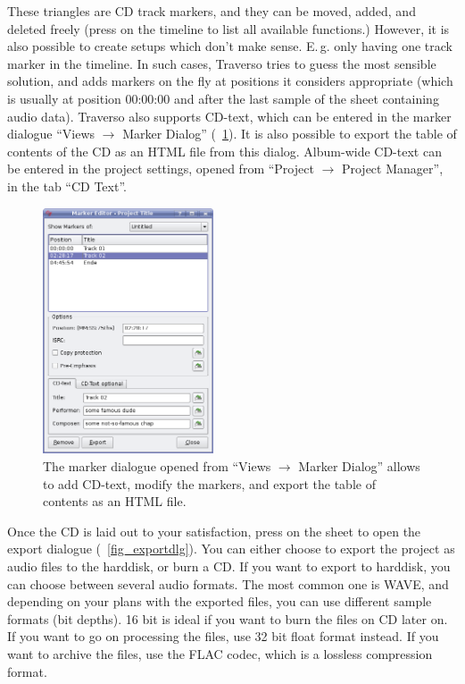 These triangles are CD track markers, and they can be moved, added, and deleted freely (press  on the timeline to list all available functions.) However, it is also possible to create setups which don't make sense. E.\,g. only having one track marker in the timeline. In such cases, Traverso tries to guess the most sensible solution, and adds markers on the fly at positions it considers appropriate (which is usually at position 00:00:00 and after the last sample of the sheet containing audio data). Traverso also supports CD-text, which can be entered in the marker dialogue ``Views $\rightarrow$ Marker Dialog'' (\FigB~\ref{fig_marker-editor}). It is also possible to export the table of contents of the CD as an HTML file from this dialog. Album-wide CD-text can be entered in the project settings, opened from ``Project $\rightarrow$ Project Manager'', in the tab ``CD Text''.

\begin{figure}[ht]
 \centering\includegraphics[width=0.45\textwidth]{images/marker-editor}
 \caption{The marker dialogue opened from ``Views $\rightarrow$ Marker Dialog'' allows to add CD-text, modify the markers, and export the table of contents as an HTML file.}
 \label{fig_marker-editor}
\end{figure}

Once the CD is laid out to your satisfaction, press  on the sheet to open the export dialogue (\FigB~\ref{fig_exportdlg}). You can either choose to export the project as audio files to the harddisk, or burn a CD. If you want to export to harddisk, you can choose between several audio formats. The most common one is WAVE, and depending on your plans with the exported files, you can use different sample formats (bit depths). 16 bit is ideal if you want to burn the files on CD later on. If you want to go on processing the files, use 32 bit float format instead. If you want to archive the files, use the FLAC codec, which is a lossless compression format.

